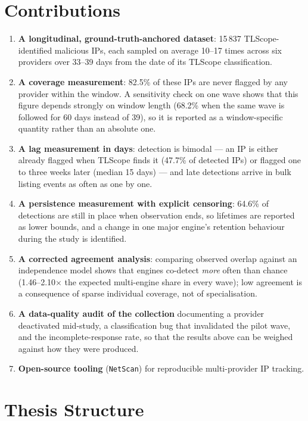 \section{Contributions}

\begin{enumerate}
  \item \textbf{A longitudinal, ground-truth-anchored dataset}: 15\,837 TLScope-identified
    malicious IPs, each sampled on average 10--17 times across six providers over 33--39 days from the date of
    its TLScope classification.
  \item \textbf{A coverage measurement}: 82.5\% of these IPs are never flagged by any provider
    within the window. A sensitivity check on one wave shows that this figure depends strongly on
    window length (68.2\% when the same wave is followed for 60 days instead of 39), so it is
    reported as a window-specific quantity rather than an absolute one.
  \item \textbf{A lag measurement in days}: detection is bimodal --- an IP is either already
    flagged when TLScope finds it (47.7\% of detected IPs) or flagged one to three weeks later
    (median 15 days) --- and late detections arrive in bulk listing events as often as one by one.
  \item \textbf{A persistence measurement with explicit censoring}: 64.6\% of detections are still
    in place when observation ends, so lifetimes are reported as lower bounds, and a change in one
    major engine's retention behaviour during the study is identified.
  \item \textbf{A corrected agreement analysis}: comparing observed overlap against an independence
    model shows that engines co-detect \emph{more} often than chance (1.46--2.10$\times$ the
    expected multi-engine share in every wave); low agreement is a consequence of sparse individual
    coverage, not of specialisation.
  \item \textbf{A data-quality audit of the collection} documenting a provider deactivated
    mid-study, a classification bug that invalidated the pilot wave, and the incomplete-response
    rate, so that the results above can be weighed against how they were produced.
  \item \textbf{Open-source tooling} (\texttt{NetScan}) for reproducible multi-provider IP
    tracking.
\end{enumerate}

\section{Thesis Structure}

